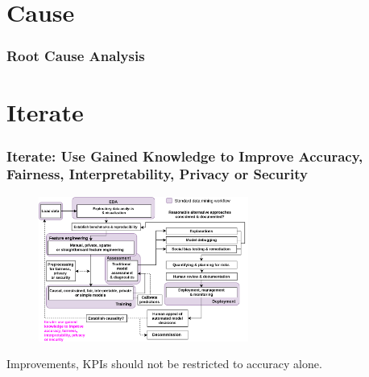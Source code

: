 \documentclass[11pt,
               aspectratio=169,
               hyperref={colorlinks}
               ]{beamer}
\begin{document}
	\section{Cause}

		\begin{frame}
		
			\frametitle{Root Cause Analysis}	
			
		\end{frame}

	\section{Iterate}

		\begin{frame}	

			\frametitle{Iterate: Use Gained Knowledge to Improve Accuracy, Fairness, Interpretability, Privacy or Security}		
			
			\begin{figure}[htb]
				\begin{center}
					\includegraphics[height=135pt]{img/iter.png}
					\label{fig:blueprint}
				\end{center}
			\end{figure}	

			\centering
			
			Improvements, KPIs should not be restricted to accuracy alone.
		
		\end{frame}

\end{document}

